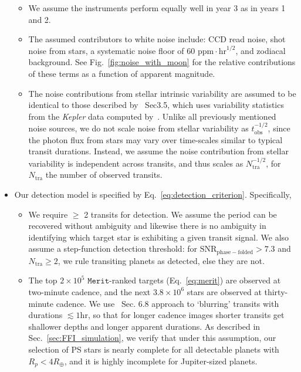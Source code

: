 \begin{itemize}
\begin{itemize}
	 \item We assume the instruments perform equally well in year 3
           as in years 1 and 2.
           
	 \item The assumed contributors to white noise include: CCD
           read noise, shot noise from stars, a systematic noise floor
           of 60 $\mathrm{ppm}\cdot\mathrm{hr}^{1/2}$, and zodiacal
           background. See Fig.~\ref{fig:noise_with_moon} for the
           relative contributions of these terms as a function of
           apparent magnitude.
           
	\item The noise contributions from stellar intrinsic
          variability are assumed to be identical to those described
          by~ Sec3.5, which uses variability
          statistics from the \textit{Kepler} data computed
          by~\citet{basri_comparison_2013}.  Unlike all previously
          mentioned noise sources, we do not scale noise from stellar
          variability as $t_\mathrm{obs}^{-1/2}$, since the photon
          flux from stars may vary over time-scales similar to typical
          transit durations.  Instead, we assume the noise
          contribution from stellar variability is independent across
          transits, and thus scales as $N_\mathrm{tra}^{-1/2}$, for
          $N_\mathrm{tra}$ the number of observed transits.
	  \end{itemize}
          
	\item Our detection model is specified by Eq.~\ref{eq:detection_criterion}.
	Specifically,

	  \begin{itemize}
                
    \item We require $\geq$ 2 transits for detection.  We assume
	     the period can be recovered without ambiguity and likewise
	     there is no ambiguity in identifying which target star is
	     exhibiting a given transit signal.
		We also assume a step-function detection threshold: for 
	  $\mathrm{SNR_\mathrm{phase-folded}} > 7.3$ and $N_\mathrm{tra} \geq 2$, 
	  we rule transiting 
	  planets as detected, else they are not.
            
	\item The top $2\times 10^5$ $\mathtt{Merit}$-ranked targets
          (Eq.~\ref{eq:merit}) are observed at two-minute cadence, and
          the next $3.8\times10^6$ stars are observed at thirty-minute
          cadence.  We use~ Sec. 6.8
          approach to `blurring' transits with durations $\lesssim
          1\mathrm{hr}$, so that for longer cadence images shorter
          transits get shallower depths and longer apparent durations.
          As described in Sec.~\ref{sec:FFI_simulation}, we verify
          that under this assumption, our selection of PS stars is
          nearly complete for all detectable planets with
          $R_p<4R_\oplus$, and it is highly incomplete for Jupiter-sized planets.


\end{itemize}
\end{itemize}
